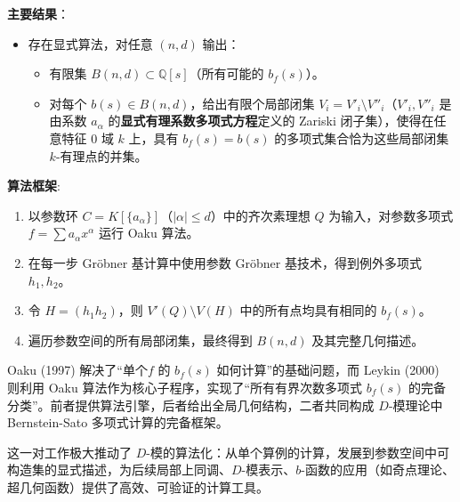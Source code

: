 \textbf{主要结果}：
\begin{itemize}
    \item 存在显式算法，对任意 \((n,d)\) 输出：
          \begin{itemize}
              \item 有限集 \(B(n,d)\subset\mathbb{Q}[s]\)（所有可能的 \(b_f(s)\)）。
              \item 对每个 \(b(s)\in B(n,d)\)，给出有限个局部闭集 \(V_i = V'_i\setminus V''_i\)（\(V'_i,V''_i\) 是由系数 \(a_\alpha\) 的\textbf{显式有理系数多项式方程}定义的 Zariski 闭子集），使得在任意特征 0 域 \(k\) 上，具有 \(b_f(s)=b(s)\) 的多项式集合恰为这些局部闭集 \(k\)-有理点的并集。
          \end{itemize}
\end{itemize}

\textbf{算法框架}:
\begin{enumerate}
    \item 以参数环 \(C = K[\{a_\alpha\}]\)（\(|\alpha|\le d\)）中的齐次素理想 \(Q\) 为输入，对参数多项式 \(f = \sum a_\alpha x^\alpha\) 运行 Oaku 算法。
    \item 在每一步 Gröbner 基计算中使用参数 Gröbner 基技术，得到例外多项式 \(h_1,h_2\)。
    \item 令 \(H = (h_1 h_2)\)，则 \(V'(Q)\setminus V(H)\) 中的所有点均具有相同的 \(b_f(s)\)。
    \item 遍历参数空间的所有局部闭集，最终得到 \(B(n,d)\) 及其完整几何描述。
\end{enumerate}



Oaku (1997) 解决了“单个\(f\) 的 \(b_f(s)\) 如何计算”的基础问题，而 Leykin (2000) 则利用 Oaku 算法作为核心子程序，实现了“所有有界次数多项式 \(b_f(s)\) 的完备分类”。前者提供算法引擎，后者给出全局几何结构，二者共同构成 \(D\)-模理论中 Bernstein-Sato 多项式计算的完备框架。

这一对工作极大推动了 \(D\)-模的算法化：从单个算例的计算，发展到参数空间中可构造集的显式描述，为后续局部上同调、\(D\)-模表示、\(b\)-函数的应用（如奇点理论、超几何函数）提供了高效、可验证的计算工具。














